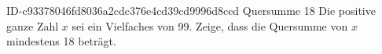 \begin{exercise}
      {ID-c93378046fd8036a2cdc376e4cd39cd9996d8ccd}
      {Quersumme 18}
  \ifproblem\problem
    Die positive ganze Zahl $x$ sei ein Vielfaches von 99. Zeige, dass die
    Quersumme von $x$ mindestens 18 beträgt.
  \fi
\end{exercise}
